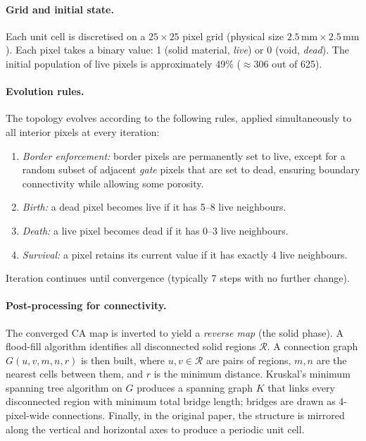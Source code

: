\documentclass{article}
\begin{document}
\paragraph{Grid and initial state.}
Each unit cell is discretised on a $25\times25$ pixel grid (physical size
$2.5\,\text{mm}\times2.5\,\text{mm}$).  Each pixel takes a binary value: 1
(solid material, \emph{live}) or 0 (void, \emph{dead}).  The initial
population of live pixels is approximately 49\% ($\approx306$ out of 625).

\paragraph{Evolution rules.}
The topology evolves according to the following rules, applied simultaneously
to all interior pixels at every iteration:
\begin{enumerate}
    \item \emph{Border enforcement:} border pixels are permanently set to live,
          except for a random subset of adjacent \emph{gate} pixels that are
          set to dead, ensuring boundary connectivity while allowing some
          porosity.
    \item \emph{Birth:} a dead pixel becomes live if it has 5--8 live
          neighbours.
    \item \emph{Death:} a live pixel becomes dead if it has 0--3 live
          neighbours.
    \item \emph{Survival:} a pixel retains its current value if it has exactly
          4 live neighbours.
\end{enumerate}
Iteration continues until convergence (typically 7 steps with no further
change).

\paragraph{Post-processing for connectivity.}
The converged CA map is inverted to yield a \emph{reverse map} (the solid
phase).  A flood-fill algorithm identifies all disconnected solid regions
$\mathcal{R}$.  A connection graph $G(u,v,m,n,r)$ is then built, where $u,
v\in\mathcal{R}$ are pairs of regions, $m,n$ are the nearest cells between
them, and $r$ is the minimum distance.  Kruskal's minimum spanning tree
algorithm on $G$ produces a spanning graph $K$ that links every disconnected
region with minimum total bridge length; bridges are drawn as 4-pixel-wide
connections.  Finally, in the original paper, the structure is mirrored along the vertical and
horizontal axes to produce a periodic unit cell.
\end{document}
